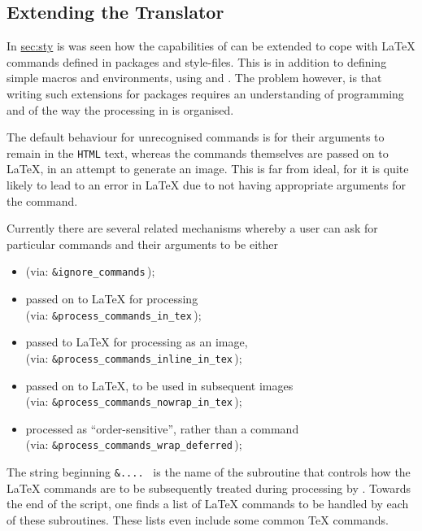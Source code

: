 \subsection{Extending the Translator\label{sec:ext}}%
\tableofchildlinks*\htmlrule
%
In \hyperref{an earlier section}{Section~}{}{sec:sty} is was seen how
the capabilities of \latextohtml{} can be extended to cope with
\LaTeX{} commands defined in packages and style-files.
This is in addition to defining simple macros and environments,
using  and .
The problem however, is that writing such extensions for packages
requires an understanding of \Perl{} programming
and of the way the processing in \latextohtml{} is organised.

%
%
\smallskip

The default behaviour for unrecognised commands is
for their arguments to remain in the \texttt{HTML} text,
whereas the commands themselves are passed on to \LaTeX,
in an attempt to generate an image. This is far from ideal,
for it is quite likely to lead to an error in \LaTeX{}
due to not having appropriate arguments for the command.

Currently there are several related mechanisms whereby a user
can ask for particular commands and their arguments to be either
\begin{itemize}
\item
{} (via: \texttt{\&ignore\_commands}\,);
\item
passed on to \LaTeX{}  for processing \\
(via: \texttt{\&process\_commands\_in\_tex}\,);
\item
passed to \LaTeX{}  for processing as an image,
\\
(via: \texttt{\&process\_commands\_inline\_in\_tex}\,);
\item
passed on to \LaTeX, 
to be used in subsequent images\\
(via: \texttt{\&process\_commands\_nowrap\_in\_tex}\,);
\item
processed as ``order-sensitive'', 
rather than a command\\
(via: \texttt{\&process\_commands\_wrap\_deferred}\,);
\end{itemize}
The string beginning \texttt{\&.... } is the name of the \Perl{} subroutine
that controls how the \LaTeX{} commands are to be subsequently treated during
processing by \latextohtml.
Towards the end of the  script, one finds a list
of \LaTeX{} commands to be handled by each of these subroutines.
These lists even include some common \TeX{} commands.


